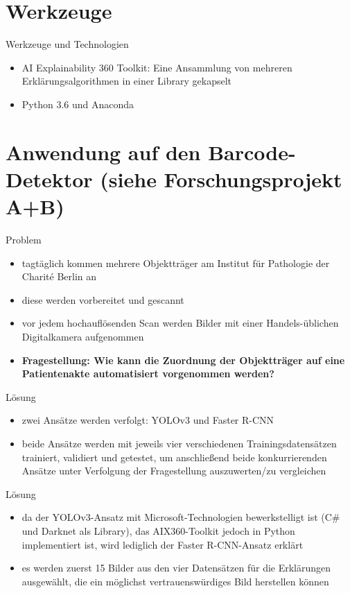 \documentclass{beamer}
\begin{document}
  \section{Werkzeuge}
  \begin{frame}{Werkzeuge und Technologien}
    \begin{itemize}
      \item AI Explainability 360 Toolkit: Eine Ansammlung von mehreren Erklärungsalgorithmen in einer Library gekapselt
      \item Python 3.6 und Anaconda
    \end{itemize}
  \end{frame}

  \section{Anwendung auf den Barcode-Detektor (siehe Forschungsprojekt A+B)}
  \begin{frame}{Problem}
    \begin{itemize}
      \item tagtäglich kommen mehrere Objektträger am Institut für Pathologie der Charité Berlin an
      \item diese werden vorbereitet und gescannt
      \item vor jedem hochauflösenden Scan werden Bilder mit einer Handels-üblichen Digitalkamera aufgenommen
      \item \textbf{Fragestellung: Wie kann die Zuordnung der Objektträger auf eine Patientenakte automatisiert vorgenommen werden?}
    \end{itemize}
  \end{frame}

  \begin{frame}{Lösung}
    \begin{itemize}
      \item zwei Ansätze werden verfolgt: YOLOv3 und Faster R-CNN
      \item beide Ansätze werden mit jeweils vier verschiedenen Trainingsdatensätzen trainiert, validiert und getestet, um anschließend beide konkurrierenden Ansätze unter Verfolgung der Fragestellung auszuwerten/zu vergleichen
    \end{itemize}
  \end{frame}

  \begin{frame}{Lösung}
    \begin{itemize}
      \item da der YOLOv3-Ansatz mit Microsoft-Technologien bewerkstelligt ist (C\# und Darknet als Library), das AIX360-Toolkit jedoch in Python implementiert ist, wird lediglich der Faster R-CNN-Ansatz erklärt
      \item es werden zuerst 15 Bilder aus den vier Datensätzen für die Erklärungen ausgewählt, die ein möglichst vertrauenswürdiges Bild herstellen können
    \end{itemize}
  \end{frame}
\end{document}
